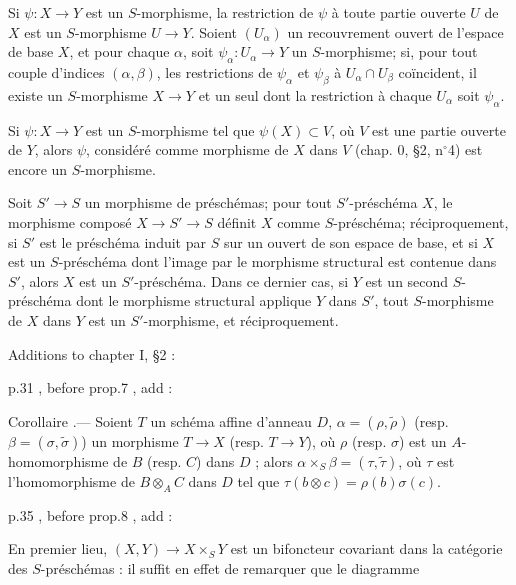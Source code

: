 \noindent Si $\psi: X \to Y$ est un $S$-morphisme, la restriction de $\psi$ à toute partie ouverte $U$ de $X$ est un $S$-morphisme $U \to Y$. Soient $(U_\alpha)$ un recouvrement ouvert de l'espace de base $X$, et pour chaque $\alpha$, soit $\psi_\alpha: U_\alpha \to Y$ un $S$-morphisme; si, pour tout couple d'indices $(\alpha, \beta)$, les restrictions de $\psi_\alpha$ et $\psi_\beta$ à $U_\alpha \cap U_\beta$ coïncident, il existe un $S$-morphisme $X \to Y$ et un seul dont la restriction à chaque $U_\alpha$ soit $\psi_\alpha$.

\noindent Si $\psi: X \to Y$ est un $S$-morphisme tel que $\psi(X) \subset V$, où $V$ est une partie ouverte de $Y$, alors $\psi$, considéré comme morphisme de $X$ dans $V$ (chap. 0, §2, n$^\circ$4) est encore un $S$-morphisme.

\noindent Soit $S' \to S$ un morphisme de préschémas; pour tout $S'$-préschéma $X$, le morphisme composé $X \to S' \to S$ définit $X$ comme $S$-préschéma; réciproquement, si $S'$ est le préschéma induit par $S$ sur un ouvert de son espace de base, et si $X$ est un $S$-préschéma dont l'image par le morphisme structural est contenue dans $S'$, alors $X$ est un $S'$-préschéma. Dans ce dernier cas, si $Y$ est un second $S$-préschéma dont le morphisme structural applique $Y$ dans $S'$, tout $S$-morphisme de $X$ dans $Y$ est un $S'$-morphisme, et réciproquement.

\newpage



Additions to chapter I, \S 2 :

p.31 , before prop.7 , add :

Corollaire .— Soient $T$ un schéma affine d'anneau $D$, $\alpha = (\rho, \tilde{\rho})$ (resp. $\beta = (\sigma, \tilde{\sigma})$) un morphisme $T \to X$ (resp. $T \to Y$), où $\rho$ (resp. $\sigma$) est un $A$-homomorphisme de $B$ (resp. $C$) dans $D$ ; alors $\alpha \times_S \beta = (\tau, \tilde{\tau})$, où $\tau$ est l'homomorphisme de $B \otimes_A C$ dans $D$ tel que $\tau(b \otimes c) = \rho(b)\sigma(c)$.

p.35 , before prop.8 , add :

En premier lieu, $(X, Y) \to X \times_S Y$ est un bifoncteur covariant dans la catégorie des $S$-préschémas : il suffit en effet de remarquer que le diagramme


